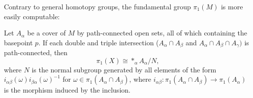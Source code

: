 Contrary to general homotopy groups, the fundamental group $\pi_1(M)$ is more easily computable:
\begin{theorem}
    Let $A_\alpha$ be a cover of $M$ by path-connected open sets, all of which containing the basepoint $p$.
    If each double and triple intersection ($A_\alpha \cap A_\beta$ and $A_\alpha \cap A_\beta \cap A_\gamma)$ is path-connected, then
    \[
        \pi_1(X) \cong *_{\alpha} A_\alpha / N
    ,\] 
    where $N$ is the normal subgroup generated by all elements of the form  $i_{\alpha \beta}(\omega) i_{\beta \alpha}(\omega)^{-1}$ for $\omega \in \pi_1(A_\alpha \cap A_\beta)$, where $i_{\alpha\beta}: \pi_1(A_\alpha \cap A_\beta) \to  \pi_1(A_\alpha)$ is the morphism induced by the inclusion.
\end{theorem}
